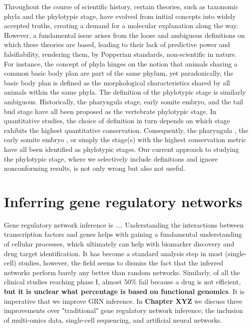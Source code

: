 Throughout the course of scientific history, certain theories, such as taxonomic phyla and the phylotypic stage, have evolved from initial concepts into widely accepted truths, creating a demand for a molecular explanation along the way. However, a fundamental issue arises from the loose and ambiguous definitions on which these theories are based, leading to their lack of predictive power and falsifiability, rendering them, by Popperian standards, non-scientific in nature. For instance, the concept of phyla hinges on the notion that animals sharing a common basic body plan are part of the same phylum, yet paradoxically, the basic body plan is defined as the morphological characteristics shared by all animals within the same phyla\cite{BUDD2000,scholtz2004bauplane}. The definition of the phylotypic stage is similarly ambiguous. Historically, the pharyngula stage\cite{BALLARD1981}, early somite embryo\cite{Alberch1993}, and the tail bud stage \cite{Slack1993} have all been proposed as the vertebrate phylotypic stage. In quantitative studies, the choice of definition in turn depends on which stage exhibits the highest quantitative conservation. Consequently, the pharyngula \cite{Irie2011,marletaz2018}, the early somite embryo \cite{DomazetLoso2010}, or simply the stage(s) with the highest conservation metric\cite{Kalinka2010,Cordero2020} have all been identified as phylotypic stages. Our current approach to studying the phylotypic stage, where we selectively include definitions and ignore nonconforming results, is not only wrong but also not useful.

\section{Inferring gene regulatory networks}

Gene regulatory network inference is .... Understanding the interactions between transcription factors and genes helps with gaining a fundamental understanding of cellular processes, which ultimately can help with biomarker discovery and drug target identification. It has become a standard analysis step in most (single-cell) studies, however, the field seems to dismiss the fact that the inferred networks perform barely any better than random networks\cite{McCalla_2021,Chen_2018,Pratapa_2020}. Similarly, of all the clinical studies reaching phase I, almost 50\% fail because a drug is not efficient\cite{Sun2022}, \textbf{but it is unclear what percentage is based on functional genomics}. It is imperative that we improve GRN inference. In \textbf{Chapter XYZ} we discuss three improvements over "traditional" gene regulatory network inference; the inclusion of multi-omics data, single-cell sequencing, and artificial neural networks.


